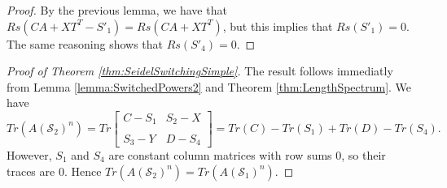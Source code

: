 \begin{proof}
By the previous lemma, we have that $Rs(CA + XT^T - S'_1) = Rs(CA + XT^T)$, but this implies that $Rs(S'_1) = 0$. The same reasoning shows that $Rs(S'_4) = 0$.
\end{proof}

\begin{proof}[Proof of Theorem \ref{thm:SeidelSwitchingSimple}] The result follows immediatly from Lemma \ref{lemma:SwitchedPowers2} and Theorem \ref{thm:LengthSpectrum}. We have
$$
Tr(A(\mathcal{S}_2)^n) = Tr\begin{bmatrix}
    C - S_1 & S_2 - X \\\\
    S_3 - Y & D - S_4
\end{bmatrix} = Tr(C) - Tr(S_1) + Tr(D) - Tr(S_4).
$$
However, $S_1$ and $S_4$ are constant column matrices with row sums $0$, so their traces are $0$. Hence $Tr(A(\mathcal{S}_2)^n) = Tr(A(\mathcal{S}_1)^n)$.
\end{proof}
